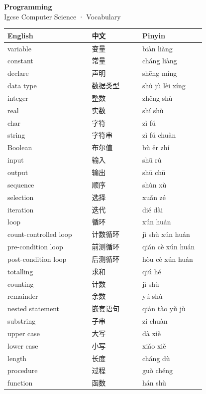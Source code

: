 \documentclass[11pt]{article}
\begin{document}
\begin{center}
  {\LARGE\bfseries Programming}\\[0.35em]
  {\large Igcse Computer Science · Vocabulary}
\end{center}
\vspace{0.6em}

\begin{longtable}{@{}p{0.40\linewidth}p{0.24\linewidth}p{0.30\linewidth}@{}}
\toprule
\textbf{English} & \textbf{中文} & \textbf{Pinyin} \\
\midrule
\endhead
\bottomrule
\endlastfoot
variable & 变量 & biàn liàng \\
constant & 常量 & cháng liàng \\
declare & 声明 & shēng míng \\
data type & 数据类型 & shù jù lèi xíng \\
integer & 整数 & zhěng shù \\
real & 实数 & shí shù \\
char & 字符 & zì fú \\
string & 字符串 & zì fú chuàn \\
Boolean & 布尔值 & bù ěr zhí \\
input & 输入 & shū rù \\
output & 输出 & shū chū \\
sequence & 顺序 & shùn xù \\
selection & 选择 & xuǎn zé \\
iteration & 迭代 & dié dài \\
loop & 循环 & xún huán \\
count-controlled loop & 计数循环 & jì shù xún huán \\
pre-condition loop & 前测循环 & qián cè xún huán \\
post-condition loop & 后测循环 & hòu cè xún huán \\
totalling & 求和 & qiú hé \\
counting & 计数 & jì shù \\
remainder & 余数 & yú shù \\
nested statement & 嵌套语句 & qiàn tào yǔ jù \\
substring & 子串 & zi chuàn \\
upper case & 大写 & dà xiě \\
lower case & 小写 & xiǎo xiě \\
length & 长度 & cháng dù \\
procedure & 过程 & guò chéng \\
function & 函数 & hán shù \\

\end{longtable}
\end{document}
